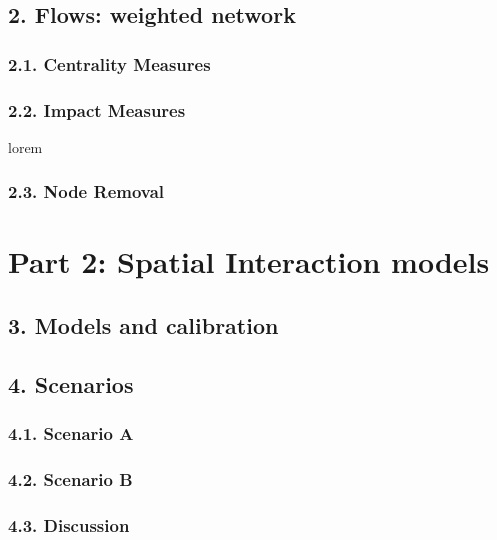 \documentclass[10pt]{report}
\numberwithin{figure}{section}
\numberwithin{table}{section}
\begin{document}
\subsection{2. Flows: weighted network} 

\subsubsection{2.1. Centrality Measures } 


\subsubsection{2.2. Impact Measures} 
lorem

\subsubsection{2.3. Node Removal} 

\section{ Part 2: Spatial Interaction models}


\subsection{3. Models and calibration}


\newpage
\subsection{4. Scenarios}
\subsubsection{4.1. Scenario A}
\subsubsection{4.2. Scenario B}
\subsubsection{4.3. Discussion}













\newpage
\printbibliography[title = {References}]
\end{document}
